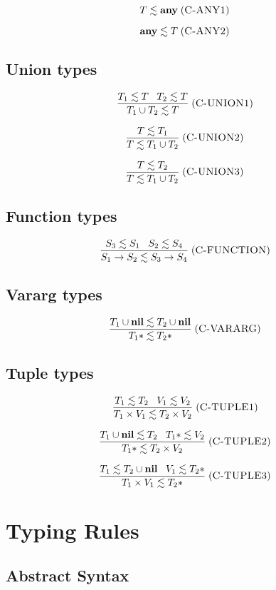 \documentclass[12pt]{article}
\newcommand{\Any}{\mathbf{any}}
\newcommand{\Nil}{\mathbf{nil}}
\newcommand{\mylabel}[1]{\; (\textsc{#1})}
\begin{document}
\[
T \lesssim \Any
\mylabel{C-ANY1}
\]

\[
\Any \lesssim T
\mylabel{C-ANY2}
\]

\subsection{Union types}

\[
\frac{T_{1} \lesssim T \;\;\; T_{2} \lesssim T}
     {T_{1} \cup T_{2} \lesssim T}
\mylabel{C-UNION1}
\]

\[
\frac{T \lesssim T_{1}}
     {T \lesssim T_{1} \cup T_{2}}
\mylabel{C-UNION2}
\]

\[
\frac{T \lesssim T_{2}}
     {T \lesssim T_{1} \cup T_{2}}
\mylabel{C-UNION3}
\]

\subsection{Function types}

\[
\frac{S_{3} \lesssim S_{1} \;\;\; S_{2} \lesssim S_{4}}
     {S_{1} \rightarrow S_{2} \lesssim S_{3} \rightarrow S_{4}}
\mylabel{C-FUNCTION}
\]

\subsection{Vararg types}

\[
\frac{T_{1} \cup \Nil \lesssim T_{2} \cup \Nil}
     {T_{1}* \lesssim T_{2}*}
\mylabel{C-VARARG}
\]

\subsection{Tuple types}

\[
\frac{T_{1} \lesssim T_{2} \;\;\; V_{1} \lesssim V_{2}}
     {T_{1} \times V_{1} \lesssim T_{2} \times V_{2}}
\mylabel{C-TUPLE1}
\]

\[
\frac{T_{1} \cup \Nil \lesssim T_{2} \;\;\; T_{1}* \lesssim V_{2}}
     {T_{1}* \lesssim T_{2} \times V_{2}}
\mylabel{C-TUPLE2}
\]

\[
\frac{T_{1} \lesssim T_{2} \cup \Nil \;\;\; V_{1} \lesssim T_{2}*}
     {T_{1} \times V_{1} \lesssim T_{2}*}
\mylabel{C-TUPLE3}
\]

\section{Typing Rules}

\subsection{Abstract Syntax}
\end{document}
